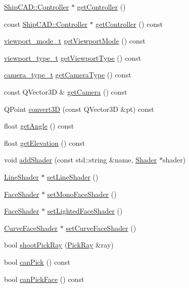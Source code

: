 \begin{DoxyCompactItemize}
\hyperlink{classShipCAD_1_1Controller}{Ship\+C\+A\+D\+::\+Controller} $\ast$ \hyperlink{classShipCAD_1_1Viewport_ae8cc8dfbda37517c2af3821cd87deb74}{get\+Controller} ()
\item 
const \hyperlink{classShipCAD_1_1Controller}{Ship\+C\+A\+D\+::\+Controller} $\ast$ \hyperlink{classShipCAD_1_1Viewport_abb20c88690f8513f48f3faa010998a5f}{get\+Controller} () const 
\item 
\hyperlink{namespaceShipCAD_a67437198ee14f74e6c5277d761894863}{viewport\+\_\+mode\+\_\+t} \hyperlink{classShipCAD_1_1Viewport_a205e5082395c6d01660ffc179c57b83e}{get\+Viewport\+Mode} () const 
\item 
\hyperlink{namespaceShipCAD_aeeeb05810f2e31ef89fd4ac6b6ba9c0a}{viewport\+\_\+type\+\_\+t} \hyperlink{classShipCAD_1_1Viewport_a5f261a1925f09917013e8e532688326a}{get\+Viewport\+Type} () const 
\item 
\hyperlink{namespaceShipCAD_a58f51ebd2e66de5e41c2ffd6f434241e}{camera\+\_\+type\+\_\+t} \hyperlink{classShipCAD_1_1Viewport_a017abe5691674d1d232ad8c012b30339}{get\+Camera\+Type} () const 
\item 
const Q\+Vector3D \& \hyperlink{classShipCAD_1_1Viewport_acce571248835d8a66fcb4787c2384824}{get\+Camera} () const 
\item 
Q\+Point \hyperlink{classShipCAD_1_1Viewport_aab16013a5098f23f3f1bb9d4318c3d3b}{convert3D} (const Q\+Vector3D \&pt) const 
\item 
float \hyperlink{classShipCAD_1_1Viewport_a9f643e335e21dc9b752098e00dc5db48}{get\+Angle} () const 
\item 
float \hyperlink{classShipCAD_1_1Viewport_a719ba3bde9e3b390215c420bd62e6b20}{get\+Elevation} () const 
\item 
void \hyperlink{classShipCAD_1_1Viewport_a886ac5965b63039799827da89bf3de20}{add\+Shader} (const std\+::string \&name, \hyperlink{classShipCAD_1_1Shader}{Shader} $\ast$shader)
\item 
\hyperlink{classShipCAD_1_1LineShader}{Line\+Shader} $\ast$ \hyperlink{classShipCAD_1_1Viewport_a0720a01f8650dc4acf89aad0649d9196}{set\+Line\+Shader} ()
\item 
\hyperlink{classShipCAD_1_1FaceShader}{Face\+Shader} $\ast$ \hyperlink{classShipCAD_1_1Viewport_ad6be617bdcab76cd2f44b0528371cd5d}{set\+Mono\+Face\+Shader} ()
\item 
\hyperlink{classShipCAD_1_1FaceShader}{Face\+Shader} $\ast$ \hyperlink{classShipCAD_1_1Viewport_a03cc2ed85178b9735c80b11dceb470b5}{set\+Lighted\+Face\+Shader} ()
\item 
\hyperlink{classShipCAD_1_1CurveFaceShader}{Curve\+Face\+Shader} $\ast$ \hyperlink{classShipCAD_1_1Viewport_af4f3c9649b9d1af1b149048fc99aebe9}{set\+Curve\+Face\+Shader} ()
\item 
bool \hyperlink{classShipCAD_1_1Viewport_aa9af80400534f46e5420916a2895ead5}{shoot\+Pick\+Ray} (\hyperlink{structShipCAD_1_1PickRay}{Pick\+Ray} \&ray)
\item 
bool \hyperlink{classShipCAD_1_1Viewport_af9b33616bfc97332f37acafe48ed4c9f}{can\+Pick} () const 
\item 
bool \hyperlink{classShipCAD_1_1Viewport_a7a09a47962bcd93cff4e390206ec7560}{can\+Pick\+Face} () const 
\end{DoxyCompactItemize}
